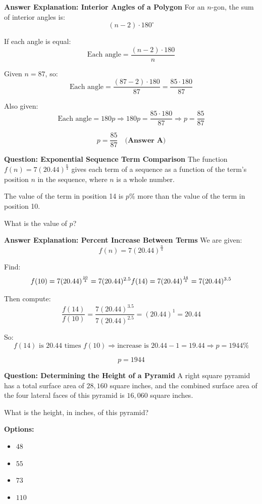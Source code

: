 \documentclass{beamer}
\begin{document}
\begin{frame}{\textbf{Answer Explanation: Interior Angles of a Polygon}}
\small
For an $n$-gon, the sum of interior angles is:
\[
(n - 2) \cdot 180^\circ
\]

If each angle is equal:
\[
\text{Each angle} = \frac{(n - 2) \cdot 180}{n}
\]

Given $n = 87$, so:
\[
\text{Each angle} = \frac{(87 - 2) \cdot 180}{87} = \frac{85 \cdot 180}{87}
\]

Also given:
\[
\text{Each angle} = 180p \Rightarrow 180p = \frac{85 \cdot 180}{87}
\Rightarrow p = \frac{85}{87}
\]

\[
\boxed{p = \frac{85}{87}} \quad \textbf{(Answer A)}
\]
\end{frame}


\begin{frame}{\textbf{Question: Exponential Sequence Term Comparison}}
\small
The function $f(n) = 7(20.44)^{\frac{n}{4}}$ gives each term of a sequence as a function of the term's position $n$ in the sequence, where $n$ is a whole number.

The value of the term in position 14 is $p\%$ more than the value of the term in position 10.

What is the value of $p$?
\end{frame}


\begin{frame}{\textbf{Answer Explanation: Percent Increase Between Terms}}
\small
We are given:
\[
f(n) = 7(20.44)^{\frac{n}{4}}
\]

Find:
\[
f(10) = 7(20.44)^{\frac{10}{4}} = 7(20.44)^{2.5} \\
f(14) = 7(20.44)^{\frac{14}{4}} = 7(20.44)^{3.5}
\]

Then compute:
\[
\frac{f(14)}{f(10)} = \frac{7(20.44)^{3.5}}{7(20.44)^{2.5}} = (20.44)^{1} = 20.44
\]

So:
\[
f(14) \text{ is } 20.44 \text{ times } f(10) \Rightarrow \text{increase is } 20.44 - 1 = 19.44
\Rightarrow p = 1944\%
\]

\[
\boxed{p = 1944}
\]
\end{frame}


\begin{frame}{\textbf{Question: Determining the Height of a Pyramid}}
\small
A right square pyramid has a total surface area of $28,\!160$ square inches, and the combined surface area of the four lateral faces of this pyramid is $16,\!060$ square inches.

What is the height, in inches, of this pyramid?

\textbf{Options:}
\begin{itemize}
    \item[(A)] $48$
    \item[(B)] $55$
    \item[(C)] $73$
    \item[(D)] $110$
\end{itemize}
\end{frame}
\end{document}

